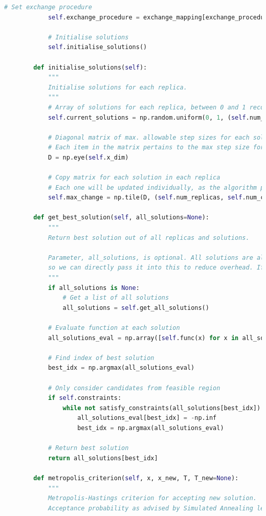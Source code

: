 \documentclass[10pt]{article}
\begin{document}
\begin{lstlisting}[language=Python, caption=PT.py, label=PTpy]
            # Set exchange procedure
            self.exchange_procedure = exchange_mapping[exchange_procedure]
    
            # Initialise solutions
            self.initialise_solutions()
    
        def initialise_solutions(self):
            """
            Initialise solutions for each replica.
            """
            # Array of solutions for each replica, between 0 and 1 recommended by Parks et al. (1990) 
            self.current_solutions = np.random.uniform(0, 1, (self.num_replicas, self.num_chains, self.x_dim))
    
            # Diagonal matrix of max. allowable step sizes for each solution
            # Each item in the matrix pertains to the max step size for each dimension of the solution
            D = np.eye(self.x_dim)
    
            # Copy matrix for each solution in each replica
            # Each one will be updated individually, as the algorithm progresses
            self.max_change = np.tile(D, (self.num_replicas, self.num_chains, 1, 1))
    
        def get_best_solution(self, all_solutions=None):
            """
            Return best solution out of all replicas and solutions.
    
            Parameter, all_solutions, is optional. All solutions are already at hand in the fitness function, 
            so we can directly pass it into this to reduce overhead. If not passed in, get_all_solutions() is called.
            """
            if all_solutions is None:
                # Get a list of all solutions
                all_solutions = self.get_all_solutions()
    
            # Evaluate function at each solution
            all_solutions_eval = np.array([self.func(x) for x in all_solutions])
    
            # Find index of best solution
            best_idx = np.argmax(all_solutions_eval)
    
            # Only consider candidates from feasible region
            if self.constraints:
                while not satisfy_constraints(all_solutions[best_idx]):
                    all_solutions_eval[best_idx] = -np.inf
                    best_idx = np.argmax(all_solutions_eval)
    
            # Return best solution
            return all_solutions[best_idx]
    
        def metropolis_criterion(self, x, x_new, T, T_new=None):
            """
            Metropolis-Hastings criterion for accepting new solution.
            Acceptance probability as advised by Simulated Annealing lecture notes (Parks et al.)
    

\end{lstlisting}
\end{document}

